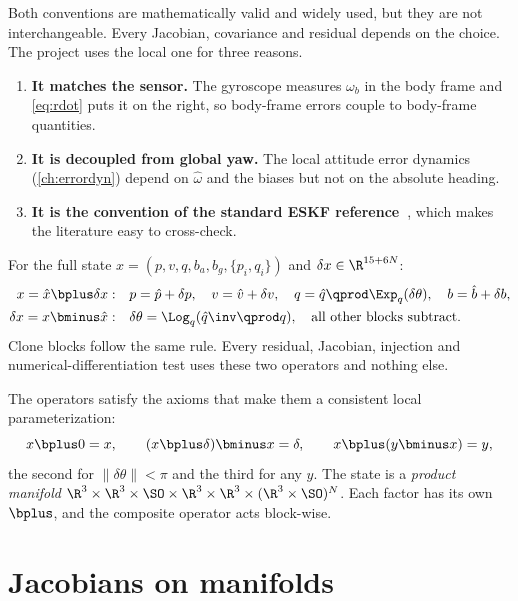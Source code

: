 Both conventions are mathematically valid and widely used, but they are not interchangeable. Every
Jacobian, covariance and residual depends on the choice. The project uses the local one for three
reasons.
\begin{enumerate}
  \item \textbf{It matches the sensor.} The gyroscope measures $\omega_b$ in the body frame and
        \eqref{eq:rdot} puts it on the right, so body-frame errors couple to body-frame quantities.
  \item \textbf{It is decoupled from global yaw.} The local attitude error dynamics
        (\cref{ch:errordyn}) depend on $\hat\omega$ and the biases but not on the absolute heading.
  \item \textbf{It is the convention of the standard ESKF reference~\cite{sola2017quaternion}}, which makes
        the literature easy to cross-check.
\end{enumerate}

\begin{convention}
For the full state $x = (p, v, q, b_a, b_g, \{p_i, q_i\})$ and $\delta x \in \R^{15 + 6N}$:
\begin{align*}
  x = \hat x \bplus \delta x:&\quad p = \hat p + \delta p,\quad v = \hat v + \delta v,\quad
       q = \hat q\qprod\Exp_q(\delta\theta),\quad b = \hat b + \delta b, \\
  \delta x = x \bminus \hat x:&\quad \delta\theta = \Log_q(\hat q\inv\qprod q),\quad\text{all other blocks subtract.}
\end{align*}
Clone blocks follow the same rule. Every residual, Jacobian, injection and numerical-differentiation test
uses these two operators and nothing else.
\end{convention}

The operators satisfy the axioms that make them a consistent local parameterization:
\begin{equation}
  x \bplus 0 = x, \qquad (x \bplus \delta) \bminus x = \delta, \qquad x \bplus (y \bminus x) = y,
\end{equation}
the second for $\|\delta\theta\| < \pi$ and the third for any $y$. The state is a \emph{product manifold}
$\R^3\times\R^3\times\SO\times\R^3\times\R^3\times(\R^3\times\SO)^N$. Each factor has its own
$\bplus$, and the composite operator acts block-wise.

\section{Jacobians on manifolds}
\label{sec:jr}

